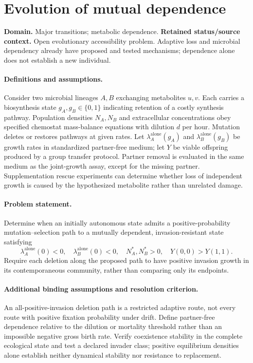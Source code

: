 \documentclass[11pt]{article}
\begin{document}
\section*{Evolution of mutual dependence}
\label{prob:155}
\label{rank:155}
\par\smallskip

\noindent\textbf{Domain.} Major transitions; metabolic dependence. \quad \textbf{Retained status/source context.} Open evolutionary accessibility problem. Adaptive loss and microbial dependency already have proposed and tested mechanisms; dependence alone does not establish a new individual.
\paragraph{Definitions and assumptions.} Consider two microbial lineages $A,B$ exchanging metabolites $u,v$. Each carries a biosynthesis state $g_A,g_B\in\{0,1\}$ indicating retention of a costly synthesis pathway. Population densities $N_A,N_B$ and extracellular concentrations obey specified chemostat mass-balance equations with dilution $d$ per hour. Mutation deletes or restores pathways at given rates. Let $\lambda_A^{\mathrm{alone}}(g_A)$ and $\lambda_B^{\mathrm{alone}}(g_B)$ be growth rates in standardized partner-free medium; let $Y$ be viable offspring produced by a group transfer protocol. Partner removal is evaluated in the same medium as the joint-growth assay, except for the missing partner. Supplementation rescue experiments can determine whether loss of independent growth is caused by the hypothesized metabolite rather than unrelated damage.
\paragraph{Problem statement.} Determine when an initially autonomous state admits a positive-probability mutation--selection path to a mutually dependent, invasion-resistant state satisfying
\[
 \lambda_A^{\mathrm{alone}}(0)<0,\quad
 \lambda_B^{\mathrm{alone}}(0)<0,\quad
 N_A^*,N_B^*>0,\quad Y(0,0)>Y(1,1).
\]
Require each deletion along the proposed path to have positive invasion growth in its contemporaneous community, rather than comparing only its endpoints.
\paragraph{Additional binding assumptions and resolution criterion.} An all-positive-invasion deletion path is a restricted adaptive route, not every route with positive fixation probability under drift. Define partner-free dependence relative to the dilution or mortality threshold rather than an impossible negative gross birth rate. Verify coexistence stability in the complete ecological state and test a declared invader class; positive equilibrium densities alone establish neither dynamical stability nor resistance to replacement.
\end{document}
